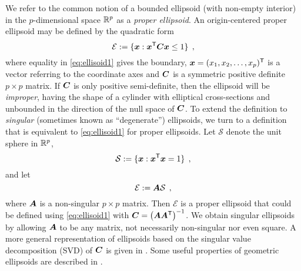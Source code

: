 We refer to the common notion of a bounded ellipsoid (with non-empty interior) in the $p$-dimensional space $\mathbb{R}^{p}$
as a \emph{proper ellipsoid}.
An origin-centered proper ellipsoid
may be defined by the quadratic form
\begin{equation}\label{eq:ellisoid1}
\mathcal{E} := \{ \bm{x}: \bm{x}^\mathsf{T} \bm{C} \bm{x} \le 1 \} \:\: ,
\end{equation}
where equality in \eqref{eq:ellisoid1} gives the boundary,
$\bm{x} = (x_1, x_2, \dots , x_p)^\mathsf{T}$ is a vector referring to the coordinate axes and $\bm{C}$ is a symmetric
positive definite $p \times p$ matrix.
If $\bm{C}$ is only positive semi-definite, then the ellipsoid will be \emph{improper}, having the shape of a cylinder with elliptical cross-sections and unbounded in the direction of the null 
space of $\bm{C}$.
To extend the definition to \emph{singular} (sometimes known as ``degenerate'') ellipsoids, we turn to a definition that is equivalent to \eqref{eq:ellisoid1} for proper ellipsoids.
Let $\mathcal{S}$ denote the unit sphere in  $\mathbb{R}^{p}$,
\begin{equation}
\mathcal{S} := \{ \bm{x}: \bm{x}^\mathsf{T}\bm{x} =1 \} \:\: ,
\end{equation}
and let
\begin{equation}\label{eq:ellisoidsph}
\mathcal{E} := \bm{A} \mathcal{S} \:\: ,
\end{equation}
where $\bm{A}$ is a non-singular $p \times p$ matrix. Then $\mathcal{E}$ is a proper ellipsoid that could be defined using 
\eqref{eq:ellisoid1} with $\bm{C} = \left( \bm{A} \bm{A}^\mathsf{T}  \right)^{-1}$.
We obtain singular ellipsoids by allowing $\bm{A}$ to be any matrix, not necessarily non-singular nor even square.
A more general representation of ellipsoids based on the singular value decomposition (SVD) of $\bm{C}$ is given in .
Some useful properties of geometric ellipsoids are described in .
